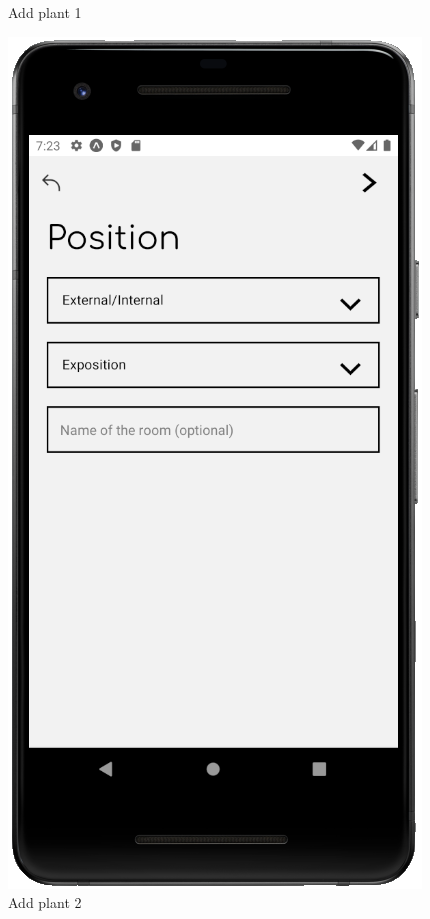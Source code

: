\documentclass[10pt]{article}
\begin{document}
\begin{figure}[h]
\begin{minipage}[h]{0.4\textwidth}
         \caption{Add plant 1}
     \end{minipage}%
     \hfill
     \begin{minipage}[h]{0.4\textwidth}
         \centering
         \includegraphics[width=\textwidth]{resources/screens/AddPlant2.PNG}
         \caption{Add plant 2}
     \end{minipage}
    \end{figure}
    
\end{document}

